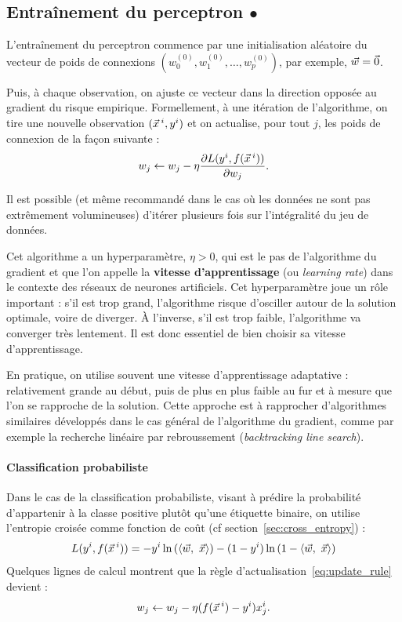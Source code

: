 \subsection{Entraînement du perceptron $\bullet$}
\label{sec:train_perceptron}

L'entraînement du perceptron commence par
une initialisation aléatoire du vecteur de poids de connexions
$\left( w_0^{(0)}, w_1^{(0)}, \dots, w_p^{(0)} \right)$, par exemple, $\ww = \vec{0}$.

Puis, à chaque observation, on ajuste ce vecteur dans la direction opposée au
gradient du risque empirique. Formellement, à une itération de l'algorithme,
on tire une nouvelle observation $(\xx^i, y^i)$ et on actualise, pour tout $j$,
les poids de connexion de la façon suivante :
\begin{equation}
  \label{eq:update_rule}
  w_j \leftarrow w_j - \eta \frac{\partial L(y^i, f(\xx^i))}{\partial w_j}.
\end{equation}

Il est possible (et même recommandé dans le cas où les données ne sont pas
extrêmement volumineuses) d'itérer plusieurs fois sur l'intégralité du jeu
de données. %

Cet algorithme a un hyperparamètre, $\eta > 0$, qui est le pas de l'algorithme
du gradient et que l'on appelle la \textbf{vitesse d'apprentissage} (ou {\it
  learning rate}) dans le contexte des réseaux de neurones artificiels. Cet
hyperparamètre joue un rôle important : s'il est trop grand, l'algorithme
risque d'osciller autour de la solution optimale, voire de diverger. À
l'inverse, s'il est trop faible, l'algorithme va converger très lentement. Il
est donc essentiel de bien choisir sa vitesse d'apprentissage.

En pratique, on utilise souvent une vitesse d'apprentissage adaptative :
relativement grande au début, puis de plus en plus faible au fur et à mesure
que l'on se rapproche de la solution. Cette approche est à rapprocher
d'algorithmes similaires développés dans le cas général de l'algorithme du
gradient, comme par exemple la recherche linéaire par rebroussement
(\textit{backtracking line search}).

\paragraph{Classification probabiliste}
Dans le cas de la classification probabiliste, visant à prédire la probabilité
d'appartenir à la classe positive plutôt qu'une étiquette binaire, on utilise
l'entropie croisée comme fonction de coût (cf section~\ref{sec:cross_entropy}) :
\begin{equation*}
  L(y^i, f(\xx^i)) = 
- y^i \ln \left( \innerproduct{\ww,~\xx} \right) - (1-y^i) \ln \left( 1 - \innerproduct{\ww,~\xx}\right) 
\end{equation*}
Quelques lignes de calcul montrent que la règle d'actualisation~\eqref{eq:update_rule} devient :
\begin{equation}
  \label{eq:update_rule_class_prob}
  w_j \leftarrow w_j - \eta (f(\xx^i) - y^i) x_j^i.
\end{equation}

